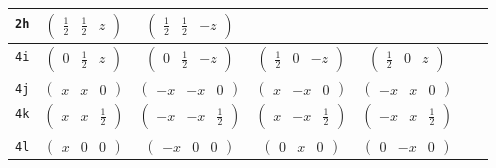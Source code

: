 \documentclass[fleqn,9pt,landscape]{jsarticle}
\begin{document}
\begin{center}
\begin{longtable}{ccccccc}
{\tt 2h} & $ \begin{pmatrix} \frac{1}{2} & \frac{1}{2} & z \end{pmatrix} $ & $ \begin{pmatrix} \frac{1}{2} & \frac{1}{2} & - z \end{pmatrix} $ & $  $ & $  $ & $  $ & $  $ \\ \hline
{\tt 4i} & $ \begin{pmatrix} 0 & \frac{1}{2} & z \end{pmatrix} $ & $ \begin{pmatrix} 0 & \frac{1}{2} & - z \end{pmatrix} $ & $ \begin{pmatrix} \frac{1}{2} & 0 & - z \end{pmatrix} $ & $ \begin{pmatrix} \frac{1}{2} & 0 & z \end{pmatrix} $ & $  $ & $  $ \\ \hline
{\tt 4j} & $ \begin{pmatrix} x & x & 0 \end{pmatrix} $ & $ \begin{pmatrix} - x & - x & 0 \end{pmatrix} $ & $ \begin{pmatrix} x & - x & 0 \end{pmatrix} $ & $ \begin{pmatrix} - x & x & 0 \end{pmatrix} $ & $  $ & $  $ \\ \hline
{\tt 4k} & $ \begin{pmatrix} x & x & \frac{1}{2} \end{pmatrix} $ & $ \begin{pmatrix} - x & - x & \frac{1}{2} \end{pmatrix} $ & $ \begin{pmatrix} x & - x & \frac{1}{2} \end{pmatrix} $ & $ \begin{pmatrix} - x & x & \frac{1}{2} \end{pmatrix} $ & $  $ & $  $ \\ \hline
{\tt 4l} & $ \begin{pmatrix} x & 0 & 0 \end{pmatrix} $ & $ \begin{pmatrix} - x & 0 & 0 \end{pmatrix} $ & $ \begin{pmatrix} 0 & x & 0 \end{pmatrix} $ & $ \begin{pmatrix} 0 & - x & 0 \end{pmatrix} $ & $  $ & $  $ \\ \hline

\end{longtable}
\end{center}
\end{document}
